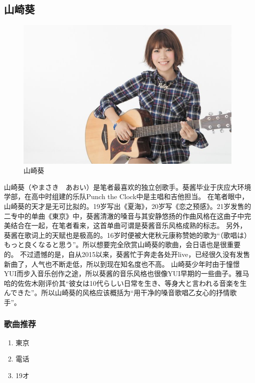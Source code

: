 \documentclass{ctexart}
\begin{document}
\subsection{山崎葵}

\begin{figure}[h]
\centering
 \includegraphics[width=1\textwidth]{yamasaki_aoi.jpg}
 \caption{山崎葵}
\end{figure}

山崎葵（やまさき　あおい）是笔者最喜欢的独立创歌手。葵酱毕业于庆应大环境学部，在高中时组建的乐队Punch the Clock中是主唱和吉他担当。
在笔者眼中，山崎葵的天才是无可比拟的。19岁写出《夏海》，20岁写《恋之预感》。21岁发售的二专中的单曲《東京》中，葵酱清澈的嗓音与其安静悠扬的作曲风格在这曲子中完美结合在一起，在笔者看来，这首单曲可谓是葵酱音乐风格成熟的标志。
另外，葵酱在歌词上的天赋也是极高的。16岁时便被大佬秋元康称赞她的歌为“（歌唱は）もっと良くなると思う”。所以想要完全欣赏山崎葵的歌曲，会日语也是很重要的。
不过遗憾的是，自从2015以来，葵酱忙于奔走各处开live，已经很久没有发售新曲了，人气也不断走低，所以到现在知名度也不高。
山崎葵少年时由于憧憬YUI而步入音乐创作之途，所以葵酱的音乐风格也很像YUI早期的一些曲子。雅马哈的佐佐木刚评价其“彼女は10代らしい日常を生き、等身大と言われる音楽を生んできた”。所以山崎葵的风格应该概括为“用干净的嗓音歌唱乙女心的抒情歌手”。

\subsubsection*{歌曲推荐}
\begin{enumerate}
\item 東京
\item 電话
\item 19オ
\end{enumerate}
\end{document}
